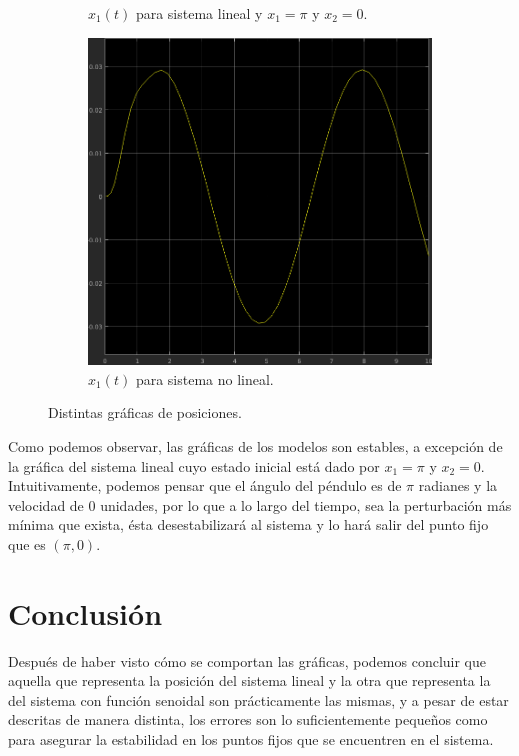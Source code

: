 \documentclass[12pt, letterpaper]{article}
\begin{document}
\begin{figure}[H]
\begin{subfigure}[b]{0.49\linewidth}
		\caption{$x_1(t)$ para sistema lineal y $x_1 = \pi$ y $x_2 = 0$.}
	\end{subfigure}
	\begin{subfigure}[b]{0.49\linewidth}
		\includegraphics[width=\linewidth]{3.png}
		\caption{$x_1(t)$ para sistema no lineal.}
	\end{subfigure}
	\caption{Distintas gráficas de posiciones.}
\end{figure}

Como podemos observar, las gráficas de los modelos son estables, a excepción de la gráfica del sistema lineal cuyo estado inicial está dado por $x_1 = \pi$ y $x_2 = 0$. Intuitivamente, podemos pensar que el ángulo del péndulo es de $\pi$ radianes y la velocidad de 0 unidades, por lo que a lo largo del tiempo, sea la perturbación más mínima que exista, ésta desestabilizará al sistema y lo hará salir del punto fijo que es $(\pi,0)$.

\section*{Conclusión}

Después de haber visto cómo se comportan las gráficas, podemos concluir que aquella que representa la posición del sistema lineal y la otra que representa la del sistema con función senoidal son prácticamente las mismas, y a pesar de estar descritas de manera distinta, los errores son lo suficientemente pequeños como para asegurar la estabilidad en los puntos fijos que se encuentren en el sistema.
\renewcommand\refname{Referencias}
\printbibliography
\end{document}
